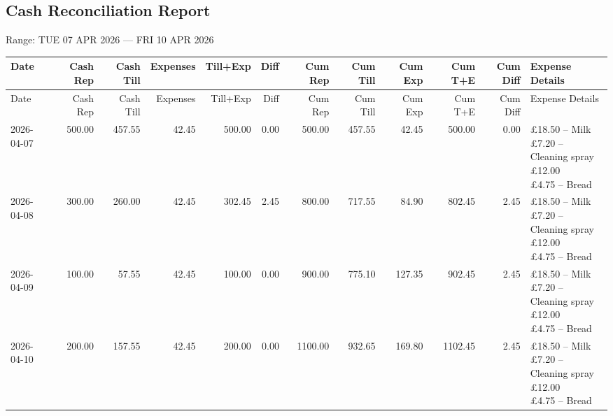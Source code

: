 \documentclass[11pt]{article}
\begin{document}
\begin{landscape}

\section*{Cash Reconciliation Report}
\noindent
Range: TUE 07 APR 2026 --- FRI 10 APR 2026

\bigskip

\footnotesize
\setlength{\LTleft}{0pt}
\setlength{\LTright}{0pt}

\begin{longtable}{p{3.2cm} r r r r r| r r r r r p{5.8cm}}
\toprule
Date & Cash Rep & Cash Till & Expenses & Till+Exp & Diff & Cum Rep & Cum Till & Cum Exp & Cum T+E & Cum Diff & Expense Details \\
\midrule
\endfirsthead

\toprule
Date & Cash Rep & Cash Till & Expenses & Till+Exp & Diff & Cum Rep & Cum Till & Cum Exp & Cum T+E & Cum Diff & Expense Details \\
\midrule
\endhead

\bottomrule
\endfoot

2026-04-07 & 500.00 & 457.55 & 42.45 & 500.00 & 0.00 & 500.00 & 457.55 & 42.45 & 500.00 & 0.00 & \makecell[l]{\pounds 18.50 -- Milk \\ \pounds 7.20 -- Cleaning spray \\ \pounds 12.00 \\ \pounds 4.75 -- Bread} \\ \hline
2026-04-08 & 300.00 & 260.00 & 42.45 & 302.45 & 2.45 & 800.00 & 717.55 & 84.90 & 802.45 & 2.45 & \makecell[l]{\pounds 18.50 -- Milk \\ \pounds 7.20 -- Cleaning spray \\ \pounds 12.00 \\ \pounds 4.75 -- Bread} \\ \hline
2026-04-09 & 100.00 & 57.55 & 42.45 & 100.00 & 0.00 & 900.00 & 775.10 & 127.35 & 902.45 & 2.45 & \makecell[l]{\pounds 18.50 -- Milk \\ \pounds 7.20 -- Cleaning spray \\ \pounds 12.00 \\ \pounds 4.75 -- Bread} \\ \hline
2026-04-10 & 200.00 & 157.55 & 42.45 & 200.00 & 0.00 & 1100.00 & 932.65 & 169.80 & 1102.45 & 2.45 & \makecell[l]{\pounds 18.50 -- Milk \\ \pounds 7.20 -- Cleaning spray \\ \pounds 12.00 \\ \pounds 4.75 -- Bread} \\ \hline
\end{longtable}

\end{landscape}
\end{document}
